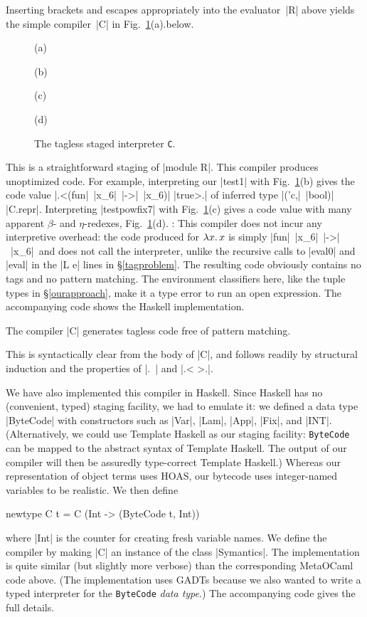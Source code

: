 Inserting brackets and escapes appropriately into the
evaluator~|R| above yields the simple compiler~|C|
\ifshort in Fig.~\ref{fig:interpreter-C}(a).\else below.
\fi
\ifshort
\begin{figure}[t]
(a) 

(b) 

(c) 

(d) 
\caption{The tagless staged interpreter \texttt{C}.}
\label{fig:interpreter-C}
\end{figure}
\fi
This is a straightforward staging of
|module R|.
This compiler produces
unoptimized code. For example, interpreting our |test1| with
\ifshort Fig.~\ref{fig:interpreter-C}(b) \else {}\fi
gives the code value |.<(fun|~|x_6|~|->|~|x_6)| |true>.|
of inferred type |('c,|~|bool)| |C.repr|.  Interpreting |testpowfix7|
with
\ifshort Fig.~\ref{fig:interpreter-C}(c) \else {}\fi
gives a code value with many apparent $\beta$- and $\eta$-redexes\ifshort,
Fig.~\ref{fig:interpreter-C}(d). \else: \fi
\ifshort\pagebreak[3]\fi
This compiler does not incur
any interpretive overhead: the
code produced for $\mathopen{\lambda\mathord{x}.\,}x$ is simply |fun|~|x_6|~|->|~|x_6|\ifshort\else\
and does not
call the interpreter, unlike the recursive calls to |eval0| and
|eval| in the |L e| lines in \S\ref{tagproblem}\fi.
The resulting code obviously contains no tags and no pattern matching.
The environment classifiers here, like the tuple types in \S\ref{ourapproach},
make it a type error to run an open expression.
\ifshort
The accompanying code shows the Haskell implementation. 
\else
\begin{proposition}
    The compiler |C| generates tagless code free of pattern matching.
\end{proposition}
This is syntactically clear from the body of |C|, and follows
readily by structural induction and the properties of |.~| and
|.< >.|.

We have also implemented this compiler in Haskell. 
Since Haskell
has no (convenient, typed) staging facility, we had to emulate
it: we defined a data type |ByteCode| with
constructors such as |Var|, |Lam|, |App|, |Fix|, and |INT|.
(Alternatively, we could use Template Haskell as our staging facility:
\texttt{ByteCode} can be mapped to the abstract syntax of Template
Haskell. The output of our compiler will then be assuredly type-correct
Template Haskell.)
Whereas our representation of object terms uses HOAS,
our bytecode uses integer-named
variables to be realistic. 
We then define 
\begin{code}
newtype C t = C (Int -> (ByteCode t, Int)) 
\end{code}
where |Int| is the counter for creating fresh variable
names. We define the compiler by making |C| an instance of the
class |Symantics|.
The implementation is quite similar (but slightly more
verbose) than the corresponding MetaOCaml code above. (The implementation uses
GADTs because we also wanted to write a typed interpreter for 
the \texttt{ByteCode} \emph{data type}.) The
accompanying code gives the full details.
\fi

